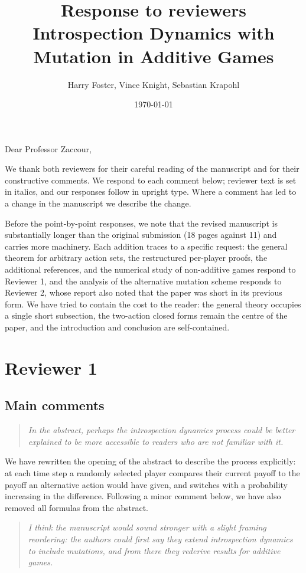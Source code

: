 \documentclass[11pt]{article}
\title{Response to reviewers\\
  \large Introspection Dynamics with Mutation in Additive Games}
\author{Harry Foster, Vince Knight, Sebastian Krapohl}
\date{\today}
\newenvironment{reviewerquote}
  {\begin{quote}\itshape}
  {\end{quote}}
\begin{document}
\maketitle

Dear Professor Zaccour,

We thank both reviewers for their careful reading of the manuscript and for
their constructive comments. We respond to each comment below; reviewer text
is set in italics, and our responses follow in upright type. Where a comment
has led to a change in the manuscript we describe the change.

Before the point-by-point responses, we note that the revised manuscript is
substantially longer than the original submission (18 pages against 11) and
carries more machinery. Each addition traces to a specific request: the
general theorem for arbitrary action sets, the restructured per-player
proofs, the additional references, and the numerical study of non-additive
games respond to Reviewer 1, and the analysis of the alternative mutation
scheme responds to Reviewer 2, whose report also noted that the paper was
short in its previous form. We have tried to contain the cost to the
reader: the general theory occupies a single short subsection, the
two-action closed forms remain the centre of the paper, and the
introduction and conclusion are self-contained.

\section*{Reviewer 1}

\subsection*{Main comments}

\begin{reviewerquote}
In the abstract, perhaps the introspection dynamics process could be better
explained to be more accessible to readers who are not familiar with it.
\end{reviewerquote}

We have rewritten the opening of the abstract to describe the process
explicitly: at each time step a randomly selected player compares their
current payoff to the payoff an alternative action would have given, and
switches with a probability increasing in the difference. Following a minor
comment below, we have also removed all formulas from the abstract.

\begin{reviewerquote}
I think the manuscript would sound stronger with a slight framing reordering:
the authors could first say they extend introspection dynamics to include
mutations, and from there they rederive results for additive games.
\end{reviewerquote}
\end{document}
